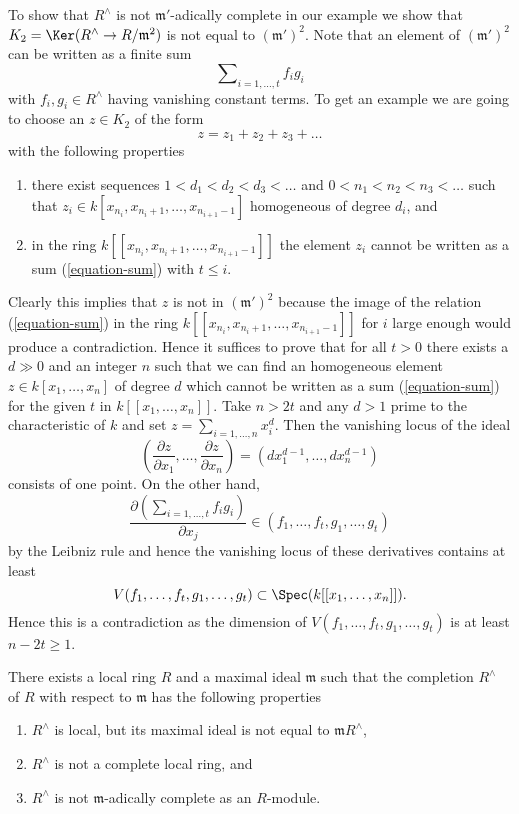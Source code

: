 \medskip\noindent
To show that $R^\wedge$ is not $\mathfrak m'$-adically complete
in our example we show that $K_2 = \Ker(R^\wedge \to R/\mathfrak m^2)$
is not equal to $(\mathfrak m')^2$.
Note that an element of $(\mathfrak m')^2$
can be written as a finite sum
\begin{equation}
\label{equation-sum}
\sum\nolimits_{i = 1, \ldots, t} f_i g_i
\end{equation}
with $f_i, g_i \in R^\wedge$ having vanishing constant terms.
To get an example we are going to choose an $z \in K_2$
of the form
$$
z = z_1 + z_2 + z_3 + \ldots
$$
with the following properties
\begin{enumerate}
\item there exist sequences $1 < d_1 < d_2 < d_3 < \ldots $ and
$0 < n_1 < n_2 < n_3 < \ldots$ such that
$z_i \in k[x_{n_i}, x_{n_i + 1}, \ldots, x_{n_{i + 1} - 1}]$
homogeneous of degree $d_i$, and
\item in the ring $k[[x_{n_i}, x_{n_i + 1}, \ldots, x_{n_{i + 1} - 1}]]$
the element $z_i$ cannot be written as a sum (\ref{equation-sum})
with $t \leq i$.
\end{enumerate}
Clearly this implies that $z$ is not in $(\mathfrak m')^2$
because the image of the relation (\ref{equation-sum}) in the
ring $k[[x_{n_i}, x_{n_i + 1}, \ldots, x_{n_{i + 1} - 1}]]$
for $i$ large enough would produce a contradiction. Hence it suffices
to prove that for all $t > 0$ there exists a $d \gg 0$ and an integer
$n$ such that we can find an homogeneous element
$z \in k[x_1, \ldots, x_n]$ of degree $d$ which cannot be written as
a sum (\ref{equation-sum}) for the given $t$ in $k[[x_1, \ldots, x_n]]$.
Take $n > 2t$ and any $d > 1$ prime to the characteristic of $k$ and
set $z = \sum_{i = 1, \ldots, n} x_i^d$. Then the vanishing locus
of the ideal
$$
(\frac{\partial z}{\partial x_1}, \ldots, \frac{\partial z}{\partial x_n})
=
(dx_1^{d - 1}, \ldots, dx_n^{d - 1})
$$
consists of one point. On the other hand,
$$
\frac{\partial ( \sum\nolimits_{i = 1, \ldots, t} f_i g_i ) }{\partial x_j}
\in (f_1, \ldots, f_t, g_1, \ldots, g_t)
$$
by the Leibniz rule and hence the vanishing locus of these derivatives
contains at least
$$
V(f_1, \ldots, f_t, g_1, \ldots, g_t) \subset
\Spec(k[[x_1, \ldots, x_n]]).
$$
Hence this is a contradiction as the dimension of
$V(f_1, \ldots, f_t, g_1, \ldots, g_t)$ is at least $n - 2t \geq 1$.

\begin{lemma}
\label{lemma-noncomplete-completion}
There exists a local ring $R$ and a maximal ideal $\mathfrak m$ such that
the completion $R^\wedge$ of $R$ with respect to $\mathfrak m$ has the
following properties
\begin{enumerate}
\item $R^\wedge$ is local, but its maximal ideal is not equal to
$\mathfrak m R^\wedge$,
\item $R^\wedge$ is not a complete local ring, and
\item $R^\wedge$ is not $\mathfrak m$-adically complete as an $R$-module.
\end{enumerate}
\end{lemma}


